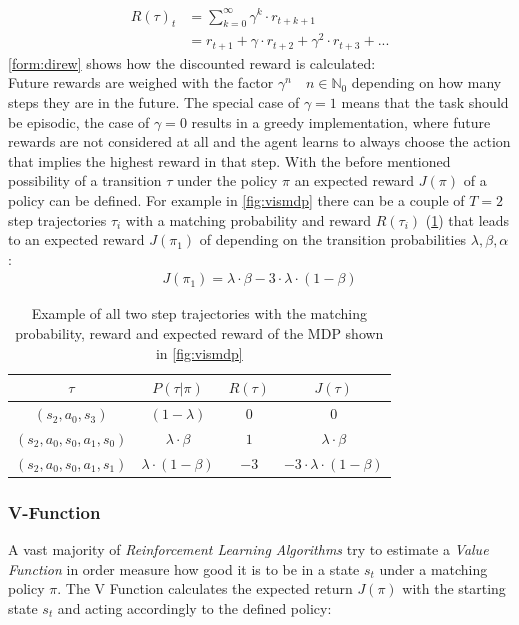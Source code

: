 \begin{align} \label{form:direw}
	R(\tau)_t &= \sum_{k=0}^{\infty} \gamma^k \cdot r_{t+k+1} \\
	&= r_{t+1} + \gamma \cdot r_{t+2} + \gamma^2 \cdot r_{t+3} + ... 
\end{align}
\newline
\cref{form:direw} shows how the discounted reward is calculated:\\
Future rewards are weighed with the factor $\gamma^n \quad n \in \mathbb{N}_0$ depending on how many steps they are in the future. The special case of $\gamma = 1$ means that the task should be episodic, the case of $\gamma = 0$ results in a greedy implementation, where future rewards are not considered at all and the agent learns to always choose the action that implies the highest reward in that step.
With the before mentioned possibility of a transition $\tau$ under the policy $\pi$ an expected reward $J(\pi)$ of a policy can be defined. For example in \cref{fig:vismdp} there can be a couple of $T=2$ step trajectories $\tau_i$ with a matching probability and reward $R(\tau_i)$ (\cref{tab:ex}) that leads to an expected reward $J(\pi_1)$ of depending on the transition probabilities $\lambda, \beta, \alpha$:
\begin{align*}
	J(\pi_1) = \lambda \cdot \beta - 3 \cdot \lambda \cdot (1-\beta)
\end{align*}
\begin{table}
	\centering
	\caption{Example of all two step trajectories with the matching probability, reward and expected reward of the MDP shown in \cref{fig:vismdp}}\label{tab:ex}
	\begin{tabular}{c|c|c|c}
		$\tau$ & $P(\tau|\pi)$ & $R(\tau)$ & $J(\tau)$\\
		\hline
		$(s_2,a_0,s_3)$ & $(1-\lambda) $ & $0$ & $0$\\
		$(s_2,a_0,s_0,a_1, s_0)$ & $ \lambda \cdot \beta$ & $1$  & $\lambda \cdot \beta$\\
		$(s_2,a_0,s_0,a_1, s_1)$ & $\lambda \cdot (1-\beta)$ & $-3$ & $-3 \cdot \lambda \cdot (1 - \beta)$\\
	\end{tabular}
\end{table}

\newpage

\subsubsection{V-Function} \label{sec:V}
A vast majority of \emph{Reinforcement Learning Algorithms} try to estimate a \emph{Value Function} in order measure how good it is to be in a state $s_t$ under a matching policy $\pi$. The V Function calculates the expected return $J(\pi)$ with the starting state $s_t$ and acting accordingly to the defined policy:

